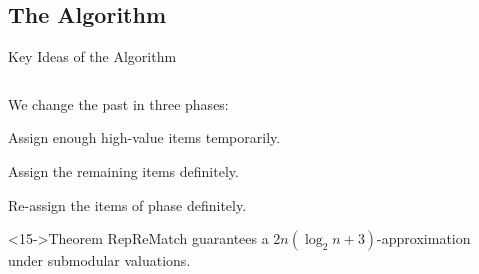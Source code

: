 




\subsection{The Algorithm}
\begin{frame}{Key Ideas of the Algorithm}
	\begin{columns}[t, onlytextwidth]
		\begin{column}{0.6\textwidth}
			We change the past in three phases:
			\begin{description}
				\item<2->[Phase \phasei]
				Assign enough high-value items \alert<2>{temporarily}.

				\item<7->[Phase \phaseii]
				Assign the remaining items \alert<7>{definitely}.

				\item<12->[Phase \phaseiii]
				Re-assign the items of phase \phasei{} \alert<12>{definitely}.
			\end{description}

			\smallskip

			\begin{exampleblock}<15->{Theorem}
				RepReMatch guarantees a \(2n(\log_2 n + 3)\)-approximation \\
				under submodular valuations.
			\end{exampleblock}
		\end{column}
		\begin{column}{0.4\textwidth}
			\vphantom{a}\vspace{-1\baselineskip}\par
			\centering
\end{column}
\end{columns}
\end{frame}
